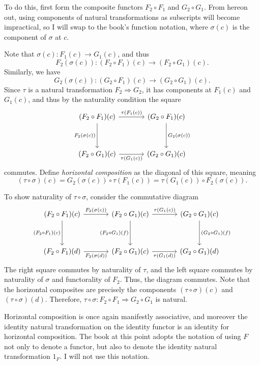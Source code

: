 To do this, first form the composite functors $F_2\circ F_1$ and $G_2\circ G_1$. From hereon out, using components of natural transformations as subscripts will become impractical, so I will swap to the book's function notation, where $\sigma (c)$ is the component of $\sigma $ at $c$.

Note that $\sigma (c): F_1(c) \to G_1(c)$, and thus
\[
	F_2(\sigma (c)): (F_2\circ F_1)(c) \to (F_2\circ G_1)(c)
.\]
Similarly, we have
\[
	G_2(\sigma (c)): (G_2\circ F_1)(c) \to (G_2\circ G_1)(c)
.\]
Since $\tau $ is a natural transformation $ F_2 \Rightarrow G_2$, it has components at $F_1(c)$ and $G_1(c)$, and thus by the naturality condition the square
\[\begin{tikzcd}[row sep = 3.5em, column sep = 3.5em]
	(F_2\circ F_1)(c)\ar[" \tau (F_1(c)) ", r] \ar[" F_2(\sigma (c)) "', d]  & (G_2\circ F_1)(c)\ar[" G_2(\sigma (c)) ", d]  \\
	(F_2\circ G_1)(c)\ar[" \tau (G_1(c)) "', r]  & (G_2\circ G_1)(c)
\end{tikzcd}\]
commutes. Define \emph{horizontal composition} as the diagonal of this square, meaning
\[
	(\tau \circ \sigma )(c)=G_2(\sigma (c))\circ \tau (F_1(c))=\tau (G_1(c))\circ F_2(\sigma (c))
.\]

To show naturality of $\tau \circ \sigma $, consider the commutative diagram
\[\begin{tikzcd}[row sep = 3.5em, column sep = 3.5em]
	(F_2\circ F_1)(c)\ar[" F_2(\sigma (c)) ", r] \ar[" (F_2\circ F_1)(c) "', d] & (F_2\circ G_1)(c)\ar[" \tau (G_1(c)) ", r] \ar[" (F_2\circ G_1)(f) "', d]  & (G_2\circ G_1)(c)\ar[" (G_2\circ G_1)(f) ", d]  \\
(F_2\circ F_1)(d)\ar[" F_2(\sigma (d))"', r]  & (F_2\circ G_1)(c)\ar[" \tau (G_1(d)) "', r]  & (G_2\circ G_1)(d)
\end{tikzcd}\]
The right square commutes by naturality of $\tau $, and the left square commutes by naturality of $\sigma $ and functorality of $F_2$. Thus, the diagram commutes. Note that the horizontal composites are precisely the components $(\tau \circ \sigma )(c)$ and $(\tau \circ \sigma )(d)$. Therefore, $\tau \circ \sigma : F_2\circ F_1 \Rightarrow G_2\circ G_1$ is natural.

Horizontal composition is once again manifestly associative, and moreover the identity natural transformation on the identity functor is an identity for horizontal composition. The book at this point adopts the notation of using $F$ not only to denote a functor, but also to denote the identity natural transformation $1_F$. I will not use this notation.

